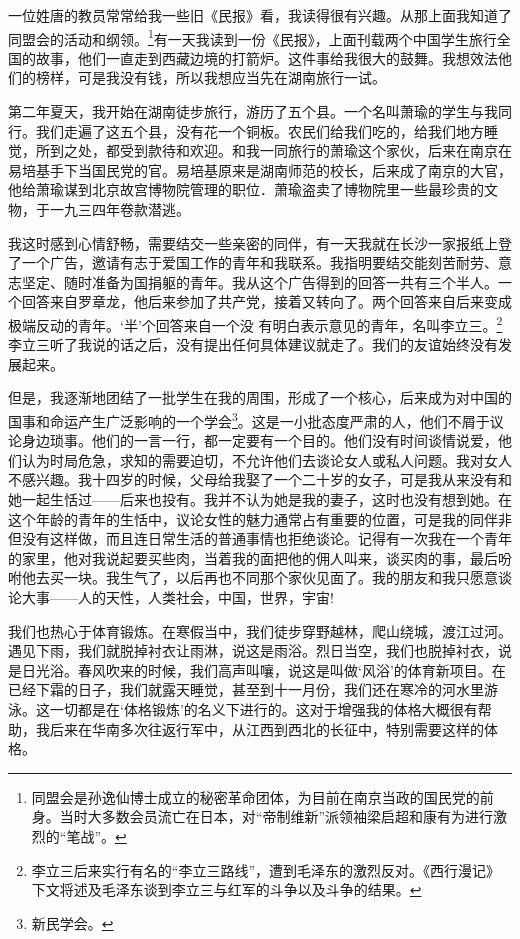 \documentclass[10pt]{book}
\begin{document}
一位姓唐的教员常常给我一些旧《民报》看，我读得很有兴趣。从那上面我知道了同盟会的活动和纲领。\footnote{同盟会是孙逸仙博士成立的秘密革命团体，为目前在南京当政的国民党的前身。当时大多数会员流亡在日本，对“帝制维新”派领袖梁启超和康有为进行激烈的“笔战”。}有一天我读到一份《民报》，上面刊载两个中国学生旅行全国的故事，他们一直走到西藏边境的打箭炉。这件事给我很大的鼓舞。我想效法他们的榜样，可是我没有钱，所以我想应当先在湖南旅行一试。

第二年夏天，我开始在湖南徒步旅行，游历了五个县。一个名叫萧瑜的学生与我同行。我们走遍了这五个县，没有花一个铜板。农民们给我们吃的，给我们地方睡觉，所到之处，都受到款待和欢迎。和我一同旅行的萧瑜这个家伙，后来在南京在易培基手下当国民党的官。易培基原来是湖南师范的校长，后来成了南京的大官，他给萧瑜谋到北京故宫博物院管理的职位．萧瑜盗卖了博物院里一些最珍贵的文物，于一九三四年卷款潜逃。

我这时感到心情舒畅，需要结交一些亲密的同伴，有一天我就在长沙一家报纸上登了一个广告，邀请有志于爱国工作的青年和我联系。我指明要结交能刻苦耐劳、意志坚定、随时准备为国捐躯的青年。我从这个广告得到的回答一共有三个半人。一个回答来自罗章龙，他后来参加了共产党，接着又转向了。两个回答来自后来变成极端反动的青年。‘半’个回答来自一个没 有明白表示意见的青年，名叫李立三。\footnote{李立三后来实行有名的“李立三路线”，遭到毛泽东的激烈反对。《西行漫记》下文将述及毛泽东谈到李立三与红军的斗争以及斗争的结果。}李立三听了我说的话之后，没有提出任何具体建议就走了。我们的友谊始终没有发展起来。

但是，我逐渐地团结了一批学生在我的周围，形成了一个核心，后来成为对中国的国事和命运产生广泛影响的一个学会\footnote{新民学会。}。这是一小批态度严肃的人，他们不屑于议论身边琐事。他们的一言一行，都一定要有一个目的。他们没有时间谈情说爱，他们认为时局危急，求知的需要迫切，不允许他们去谈论女人或私人问题。我对女人不感兴趣。我十四岁的时候，父母给我娶了一个二十岁的女子，可是我从来没有和她一起生恬过——后来也投有。我并不认为她是我的妻子，这时也没有想到她。在这个年龄的青年的生恬中，议论女性的魅力通常占有重要的位置，可是我的同伴非但没有这样做，而且连日常生活的普通事情也拒绝谈论。记得有一次我在一个青年的家里，他对我说起要买些肉，当着我的面把他的佣人叫来，谈买肉的事，最后吩咐他去买一块。我生气了，以后再也不同那个家伙见面了。我的朋友和我只愿意谈论大事——人的天性，人类社会，中国，世界，宇宙!

我们也热心于体育锻炼。在寒假当中，我们徒步穿野越林，爬山绕城，渡江过河。遇见下雨，我们就脱掉衬衣让雨淋，说这是雨浴。烈日当空，我们也脱掉衬衣，说是日光浴。春风吹来的时候，我们高声叫嚷，说这是叫做‘风浴’的体育新项目。在已经下霜的日子，我们就露天睡觉，甚至到十一月份，我们还在寒冷的河水里游泳。这一切都是在‘体格锻炼’的名义下进行的。这对于增强我的体格大概很有帮助，我后来在华南多次往返行军中，从江西到西北的长征中，特别需要这样的体格。
\end{document}
